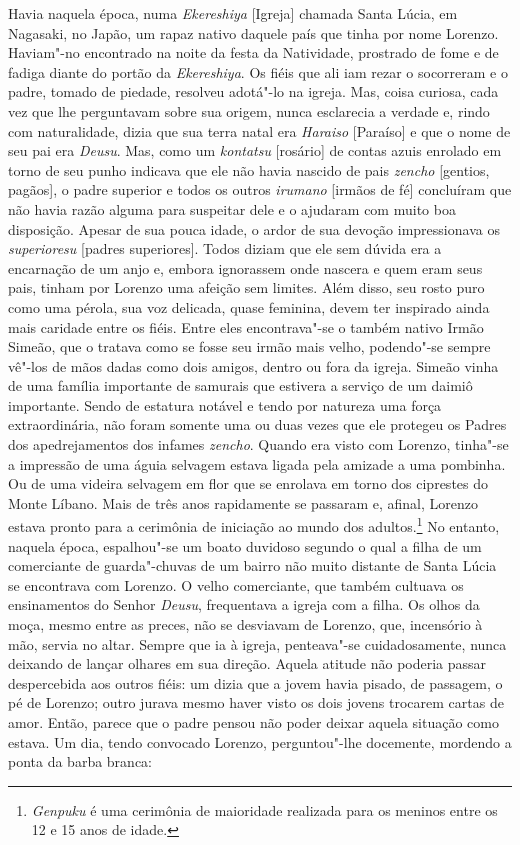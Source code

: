 \noindent{}Havia naquela época, numa \textit{Ekereshiya} [Igreja] chamada Santa
Lúcia, em Nagasaki, no Japão, um rapaz nativo daquele país que tinha
por nome Lorenzo. Haviam"-no encontrado na noite da festa da Natividade,
prostrado de fome e de fadiga diante do portão da \textit{Ekereshiya}.
Os fiéis que ali iam rezar o socorreram e o padre, tomado de piedade,
resolveu adotá"-lo na igreja. Mas, coisa curiosa, cada vez que lhe
perguntavam sobre sua origem, nunca esclarecia a verdade e, rindo com
naturalidade, dizia que sua terra natal era \textit{Haraiso} [Paraíso]
e que o nome de seu pai era \textit{Deusu}. Mas, como um
\textit{kontatsu} [rosário] de contas azuis enrolado em torno de seu
punho indicava que ele não havia nascido de pais \textit{zencho} [gentios, pagãos], 
o padre superior e todos os outros \textit{irumano} [irmãos de fé] 
concluíram que não havia razão alguma para suspeitar
dele e o ajudaram com muito boa disposição. Apesar de sua pouca idade,
o ardor de sua devoção impressionava os \textit{superioresu} [padres
superiores]. Todos diziam que ele sem dúvida era a encarnação de um
anjo e, embora ignorassem onde nascera e quem eram seus pais, tinham
por Lorenzo uma afeição sem limites. Além disso, seu rosto puro como
uma pérola, sua voz delicada, quase feminina, devem ter inspirado ainda
mais caridade entre os fiéis. Entre eles encontrava"-se o também nativo
Irmão Simeão, que o tratava como se fosse seu irmão mais velho,
podendo"-se sempre vê"-los de mãos dadas como dois amigos, dentro ou fora
da igreja. Simeão vinha de uma família importante de samurais que
estivera a serviço de um daimiô importante. Sendo de estatura notável e
tendo por natureza uma força extraordinária, não foram somente uma ou
duas vezes que ele protegeu os Padres dos apedrejamentos dos infames
\textit{zencho}. Quando era visto com Lorenzo, tinha"-se a impressão de
uma águia selvagem estava ligada pela amizade a uma pombinha. Ou de uma
videira selvagem em flor que se enrolava em torno dos ciprestes do
Monte Líbano. Mais de três anos rapidamente se passaram e, afinal,
Lorenzo estava pronto para a cerimônia de iniciação ao mundo dos
adultos.\footnote{ \textit{Genpuku} é uma cerimônia de maioridade realizada
para os meninos entre os 12 e 15 anos de idade. } No entanto, naquela
época, espalhou"-se um boato duvidoso segundo o qual a filha de um
comerciante de guarda"-chuvas de um bairro não muito distante de Santa
Lúcia se encontrava com Lorenzo. O velho comerciante, que também
cultuava os ensinamentos do Senhor \textit{Deusu}, frequentava a igreja
com a filha. Os olhos da moça, mesmo entre as preces, não se desviavam
de Lorenzo, que, incensório à mão, servia no altar. Sempre que ia à
igreja, penteava"-se cuidadosamente, nunca deixando de lançar olhares em
sua direção. Aquela atitude não poderia passar despercebida aos outros
fiéis: um dizia que a jovem havia pisado, de passagem, o pé de Lorenzo;
outro jurava mesmo haver visto os dois jovens trocarem cartas de amor.
Então, parece que o padre pensou não poder deixar aquela situação como
estava. Um dia, tendo convocado Lorenzo, perguntou"-lhe docemente,
mordendo a ponta da barba branca:

